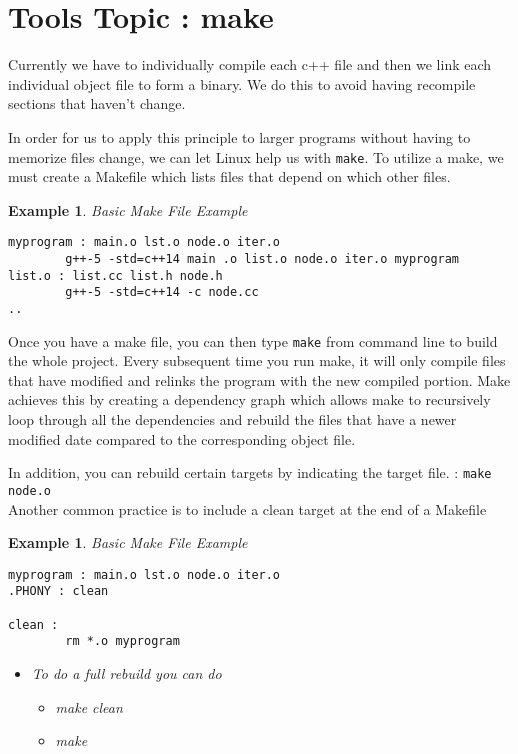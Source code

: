 \documentclass{article}
\newtheorem{ex}[theorem]{Example}
\begin{document}
\section{Tools Topic : make }

Currently we have to individually compile each c++ file and then we link each individual object file to form a binary. We do this to avoid having recompile sections that haven't change. 

In order for us to apply this principle to larger programs without having to memorize files change, we can let Linux help us with \verb|make|. To utilize a make, we must create a Makefile which lists files that depend on which other files. 

\begin{ex} Basic Make File Example 
\begin{lstlisting}
myprogram : main.o lst.o node.o iter.o 
		g++-5 -std=c++14 main .o list.o node.o iter.o myprogram 
list.o : list.cc list.h node.h 
	    g++-5 -std=c++14 -c node.cc
..
\end{lstlisting}
\end{ex}

Once you have a make file, you can then type \verb|make| from command line to build the whole project. Every subsequent time you run make, it will only compile files that have modified and relinks the program with the new compiled portion.  Make achieves this by creating a dependency graph which allows make to recursively loop through all the dependencies and rebuild the files that have a newer modified date compared to the corresponding object file.  

In addition, you can rebuild certain targets by indicating the target file. : \verb|make node.o| \\
Another common practice is to include a clean target at the end of a Makefile 

\begin{ex} Basic Make File Example 
\begin{lstlisting}
myprogram : main.o lst.o node.o iter.o 
.PHONY : clean 

clean : 
		rm *.o myprogram 
\end{lstlisting}
\begin{itemize}
\item To do a full rebuild you can do 
\begin{itemize}
\item make clean 
\item make 
\end{itemize}
\end{itemize}
\end{ex}
\end{document}
